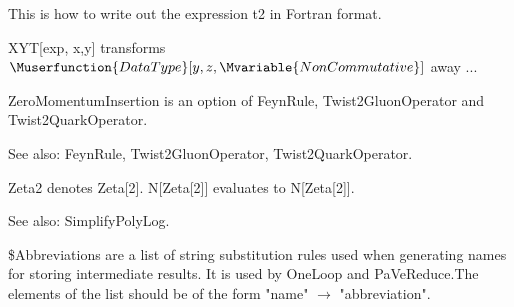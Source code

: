 




This is how to write out the expression t2 in Fortran format.







XYT[exp, x,y] transforms { }\(\Muserfunction{DataType}[y,z,\Mvariable{NonCommutative}]\) away ...



ZeroMomentumInsertion is an option of FeynRule, Twist2GluonOperator and Twist2QuarkOperator.

See also: { }FeynRule, Twist2GluonOperator, Twist2QuarkOperator.



Zeta2 denotes Zeta[2]. N[Zeta[2]] evaluates to N[Zeta[2]].

See also: SimplifyPolyLog.



\dispSFoutmath{
\{ \}
}







\${}Abbreviations are a list of string substitution rules used when generating names for storing intermediate results. It is used by
  OneLoop and PaVeReduce.The elements of the list should be of the form "name" \(\rightarrow \) "abbreviation".

